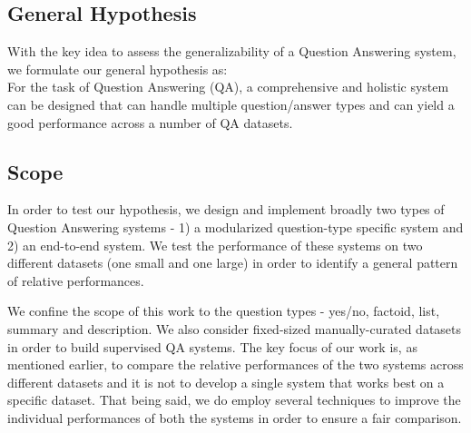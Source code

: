 \subsection{General Hypothesis}

With the key idea to assess the generalizability of a Question Answering system, we formulate our general hypothesis as: \\

For the task of Question Answering (QA), a comprehensive and holistic system can be designed that can handle multiple question/answer types and can yield a good performance across a number of QA datasets.

\subsection{Scope}

In order to test our hypothesis, we design and implement broadly two types of Question Answering systems - 1) a modularized question-type specific system and 2) an end-to-end system. We test the performance of these systems on two different datasets (one small and one large) in order to identify a general pattern of relative performances. 

We confine the scope of this work to the question types - yes/no, factoid, list, summary and description. We also consider fixed-sized manually-curated datasets in order to build supervised QA systems. The key focus of our work is, as mentioned earlier, to compare the relative performances of the two systems across different datasets and it is not to develop a single system that works best on a specific dataset. That being said, we do employ several techniques to improve the individual performances of both the systems in order to ensure a fair comparison.


    
